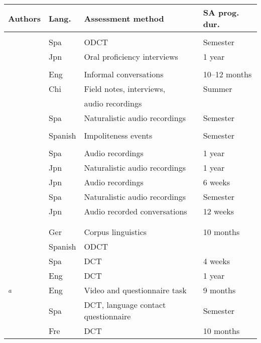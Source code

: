 \documentclass[output=paper]{langscibook}
\begin{document}
\begin{table}
\small
\begin{tabularx}{\textwidth}{>{\raggedright\arraybackslash}p{2.5cm}lQp{2cm}}
    \midrule
    Authors & Lang. & Assessment method & SA prog. dur.\\
    \midrule
		 \\
		\citet{Cordelia1996} & Spa  & ODCT 					      & Semester \\
		\citet{Iwasaki2008}  & Jpn & Oral proficiency interviews & 1 year \\
		\midrule
		 \\
		\citet{BellSalsbury2014}  & Eng & Informal conversations        & 10--12 months \\
		\citet{Kinginger2015} & Chi & Field notes, interviews,      & Summer      \\
							  &         & audio recordings			    &             \\
		\citet{Shively2013}   & Spa & Naturalistic audio recordings & Semester 	  \\
		\midrule
		 \\
		\citet{Félix-BrasdeferMcKinnon2017} & Spanish & Impoliteness events & Semester \\
		\midrule
		 \\
		\citet{Dings2014}    & Spa  & Audio recordings   & 1 year \\
		\citet{Ishida2010}   & Jpn & Naturalistic audio recordings & 1 year \\
		\citet{Masuda2011}   & Jpn & Audio recordings   & 6 weeks \\
		\citet{Shively2015,Shively2016} & Spa  & Naturalistic audio recordings & Semester \\
		\citet{Taguchi2014development}  & Jpn & Audio recorded conversations    & 12 weeks \\
		\midrule
		 \\
    \tablevspace
		 \\
		\citet{Barron2019}       & Ger  & Corpus linguistics    & 10 months \\
		\citet{DiBartolomeoJung2019}         & Spanish & ODCT 			  	   & \\
		\citet{Hernández2018a}   & Spa & DCT            	   & 4 weeks \\
		\citet{Kondo1997}  	     & Eng & DCT				   & 1 year \\
		\citet{Schauer2006,Schauer2009}\textsuperscript{\textit{a}} & Eng & Video and questionnaire task & 9 months \\
    \citet{ShivelyCohen2008}     	 & Spa & DCT, language contact questionnaire & Semester \\
		\citet{WargaScholmberger2007} & Fre  & DCT            	   & 10 months \\
    \end{tabularx}
    \end{table}
\end{document}
